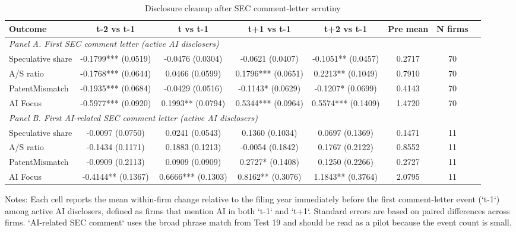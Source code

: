 \begin{table}[!htbp]
\centering
\caption{Disclosure cleanup after SEC comment-letter scrutiny}
\small
\begin{tabular}{lccccccl}
\hline
Outcome & t-2 vs t-1 & t vs t-1 & t+1 vs t-1 & t+2 vs t-1 & Pre mean & N firms \\
\hline
\multicolumn{7}{l}{\textit{Panel A. First SEC comment letter (active AI disclosers)}} \\
Speculative share & -0.1799*** (0.0519) & -0.0476 (0.0304) & -0.0621 (0.0407) & -0.1051** (0.0457) & 0.2717 & 70 \\
A/S ratio & -0.1768*** (0.0644) & 0.0466 (0.0599) & 0.1796*** (0.0651) & 0.2213** (0.1049) & 0.7910 & 70 \\
PatentMismatch & -0.1935*** (0.0684) & -0.0429 (0.0516) & -0.1143* (0.0629) & -0.1207* (0.0699) & 0.4143 & 70 \\
AI Focus & -0.5977*** (0.0920) & 0.1993** (0.0794) & 0.5344*** (0.0964) & 0.5574*** (0.1409) & 1.4720 & 70 \\
\hline
\multicolumn{7}{l}{\textit{Panel B. First AI-related SEC comment letter (active AI disclosers)}} \\
Speculative share & -0.0097 (0.0750) & 0.0241 (0.0543) & 0.1360 (0.1034) & 0.0697 (0.1369) & 0.1471 & 11 \\
A/S ratio & -0.1434 (0.1171) & 0.1883 (0.1213) & -0.0054 (0.1842) & 0.1767 (0.2122) & 0.8552 & 11 \\
PatentMismatch & -0.0909 (0.2113) & 0.0909 (0.0909) & 0.2727* (0.1408) & 0.1250 (0.2266) & 0.2727 & 11 \\
AI Focus & -0.4144** (0.1367) & 0.6666*** (0.1303) & 0.8162** (0.3076) & 1.1843** (0.3764) & 2.0795 & 11 \\
\hline
\end{tabular}
\begin{flushleft}
\footnotesize Notes: Each cell reports the mean within-firm change relative to the filing year immediately before the first comment-letter event (`t-1`) among active AI disclosers, defined as firms that mention AI in both `t-1` and `t+1`. Standard errors are based on paired differences across firms. `AI-related SEC comment` uses the broad phrase match from Test 19 and should be read as a pilot because the event count is small.
\end{flushleft}
\end{table}